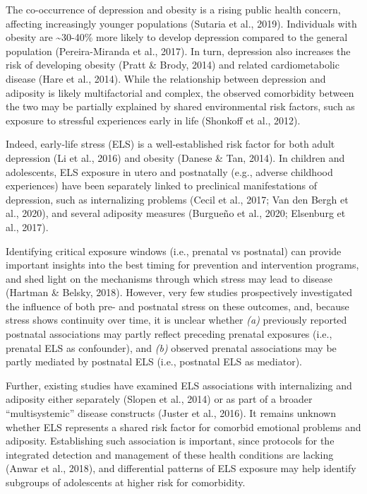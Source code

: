\documentclass[
  letterpaper,
  DIV=11,
  numbers=noendperiod]{scrreport}
\begin{document}
The co-occurrence of depression and obesity is a rising public health
concern, affecting increasingly younger populations (Sutaria et al.,
2019). Individuals with obesity are \textasciitilde30-40\% more likely
to develop depression compared to the general population
(Pereira-Miranda et al., 2017). In turn, depression also increases the
risk of developing obesity (Pratt \& Brody, 2014) and related
cardiometabolic disease (Hare et al., 2014). While the relationship
between depression and adiposity is likely multifactorial and complex,
the observed comorbidity between the two may be partially explained by
shared environmental risk factors, such as exposure to stressful
experiences early in life (Shonkoff et al., 2012).

Indeed, early-life stress (ELS) is a well-established risk factor for
both adult depression (Li et al., 2016) and obesity (Danese \& Tan,
2014). In children and adolescents, ELS exposure in utero and
postnatally (e.g., adverse childhood experiences) have been separately
linked to preclinical manifestations of depression, such as
internalizing problems (Cecil et al., 2017; Van den Bergh et al., 2020),
and several adiposity measures (Burgueño et al., 2020; Elsenburg et al.,
2017).

Identifying critical exposure windows (i.e., prenatal vs postnatal) can
provide important insights into the best timing for prevention and
intervention programs, and shed light on the mechanisms through which
stress may lead to disease (Hartman \& Belsky, 2018). However, very few
studies prospectively investigated the influence of both pre- and
postnatal stress on these outcomes, and, because stress shows continuity
over time, it is unclear whether \emph{(a)} previously reported
postnatal associations may partly reflect preceding prenatal exposures
(i.e., prenatal ELS as confounder), and \emph{(b)} observed prenatal
associations may be partly mediated by postnatal ELS (i.e., postnatal
ELS as mediator).

Further, existing studies have examined ELS associations with
internalizing and adiposity either separately (Slopen et al., 2014) or
as part of a broader ``multisystemic'' disease constructs (Juster et
al., 2016). It remains unknown whether ELS represents a shared risk
factor for comorbid emotional problems and adiposity. Establishing such
association is important, since protocols for the integrated detection
and management of these health conditions are lacking (Anwar et al.,
2018), and differential patterns of ELS exposure may help identify
subgroups of adolescents at higher risk for comorbidity.
\end{document}

